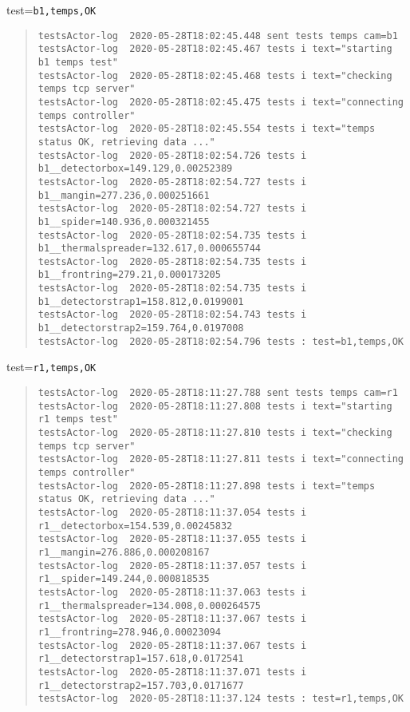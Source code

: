 test=\texttt{b1,temps,OK}

\begin{quote}
\begin{tiny}
\begin{verbatim}
testsActor-log  2020-05-28T18:02:45.448 sent tests temps cam=b1
testsActor-log  2020-05-28T18:02:45.467 tests i text="starting b1 temps test"
testsActor-log  2020-05-28T18:02:45.468 tests i text="checking temps tcp server"
testsActor-log  2020-05-28T18:02:45.475 tests i text="connecting temps controller"
testsActor-log  2020-05-28T18:02:45.554 tests i text="temps status OK, retrieving data ..."
testsActor-log  2020-05-28T18:02:54.726 tests i b1__detectorbox=149.129,0.00252389
testsActor-log  2020-05-28T18:02:54.727 tests i b1__mangin=277.236,0.000251661
testsActor-log  2020-05-28T18:02:54.727 tests i b1__spider=140.936,0.000321455
testsActor-log  2020-05-28T18:02:54.735 tests i b1__thermalspreader=132.617,0.000655744
testsActor-log  2020-05-28T18:02:54.735 tests i b1__frontring=279.21,0.000173205
testsActor-log  2020-05-28T18:02:54.735 tests i b1__detectorstrap1=158.812,0.0199001
testsActor-log  2020-05-28T18:02:54.743 tests i b1__detectorstrap2=159.764,0.0197008
testsActor-log  2020-05-28T18:02:54.796 tests : test=b1,temps,OK
\end{verbatim}
\end{tiny}
\end{quote}

\noindent test=\texttt{r1,temps,OK}

\begin{quote}
\begin{tiny}
\begin{verbatim}
testsActor-log  2020-05-28T18:11:27.788 sent tests temps cam=r1
testsActor-log  2020-05-28T18:11:27.808 tests i text="starting r1 temps test"
testsActor-log  2020-05-28T18:11:27.810 tests i text="checking temps tcp server"
testsActor-log  2020-05-28T18:11:27.811 tests i text="connecting temps controller"
testsActor-log  2020-05-28T18:11:27.898 tests i text="temps status OK, retrieving data ..."
testsActor-log  2020-05-28T18:11:37.054 tests i r1__detectorbox=154.539,0.00245832
testsActor-log  2020-05-28T18:11:37.055 tests i r1__mangin=276.886,0.000208167
testsActor-log  2020-05-28T18:11:37.057 tests i r1__spider=149.244,0.000818535
testsActor-log  2020-05-28T18:11:37.063 tests i r1__thermalspreader=134.008,0.000264575
testsActor-log  2020-05-28T18:11:37.067 tests i r1__frontring=278.946,0.00023094
testsActor-log  2020-05-28T18:11:37.067 tests i r1__detectorstrap1=157.618,0.0172541
testsActor-log  2020-05-28T18:11:37.071 tests i r1__detectorstrap2=157.703,0.0171677
testsActor-log  2020-05-28T18:11:37.124 tests : test=r1,temps,OK

\end{verbatim}
\end{tiny}
\end{quote}

